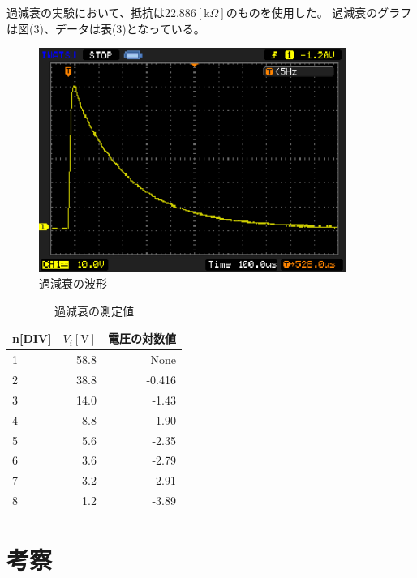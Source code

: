 \documentclass[a4j,10pt]{jarticle}
\begin{document}
過減衰の実験において、抵抗は$22.886[\mathrm k \Omega]$のものを使用した。
過減衰のグラフは図(3)、データは表(3)となっている。
\begin{figure}[h]
\begin{center}
\includegraphics[width=10cm]{over.eps}
\caption{過減衰の波形}
\end{center}
\end{figure}
\begin{table}[h]
\begin{center}
\caption{過減衰の測定値}
\begin{tabular}{|l|r|r|}
\hline
n[DIV]&$V_{i}[\mathrm V]$&電圧の対数値 \\ \hline \hline
1&58.8&None \\ \hline
2&38.8&-0.416 \\ \hline
3&14.0&-1.43 \\ \hline
4&8.8&-1.90 \\ \hline
5&5.6&-2.35  \\ \hline
6&3.6&-2.79  \\ \hline
7&3.2&-2.91  \\ \hline
8&1.2&-3.89  \\ \hline
\end{tabular}
\end{center}
\end{table}

\section{考察}
\end{document}
